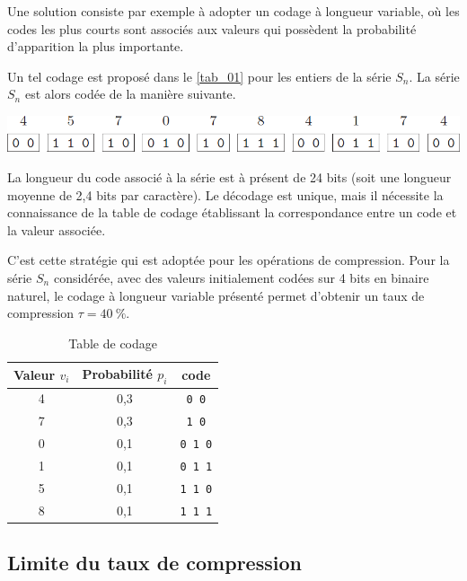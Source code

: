 \documentclass[10pt,fleqn]{article} %
\begin{document}
Une solution consiste par exemple à adopter un codage à longueur variable, où les codes les plus
courts sont associés aux valeurs qui possèdent la probabilité d'apparition la plus importante.

Un tel codage est proposé dans le \autoref{tab_01} pour les entiers de la série $S_n$. La série $S_n$ est
alors codée de la manière suivante.

\begin{center}
\includegraphics[width=.7\linewidth]{images/fig_04}
\end{center}



\begin{minipage}[b]{.55\linewidth}
La longueur du code associé à la série est à présent de
24 bits (soit une longueur moyenne de 2,4 bits par caractère).
Le décodage est unique, mais il nécessite la connaissance de la
table de codage établissant la correspondance entre un code
et la valeur associée.

C'est cette stratégie qui est adoptée pour les opérations
de compression. Pour la série $S_n$ considérée, avec des valeurs
initialement codées sur 4 bits en binaire naturel, le codage à
longueur variable présenté permet d'obtenir un taux de compression
$\tau = \SI{40}{\%}$.
\end{minipage}
\hfill
\begin{minipage}[b]{.4\linewidth}
\begin{table}[H]
\centering
\begin{tabular}{|c|c|c|}
\hline
Valeur $v_i$ & Probabilité $p_i$ & code \\
\hline
4 & 0,3 & \texttt{0 0}\\
7 & 0,3 & \texttt{1 0}\\
0 & 0,1 & \texttt{0 1 0}\\
1 & 0,1 & \texttt{0 1 1}\\
5 & 0,1 & \texttt{1 1 0}\\
8 & 0,1 & \texttt{1 1 1}\\
\hline
\end{tabular}
\caption{Table de codage\label{tab_01}}
\end{table}
\end{minipage}
\fi

\subsection{Limite du taux de compression}
\end{document}
